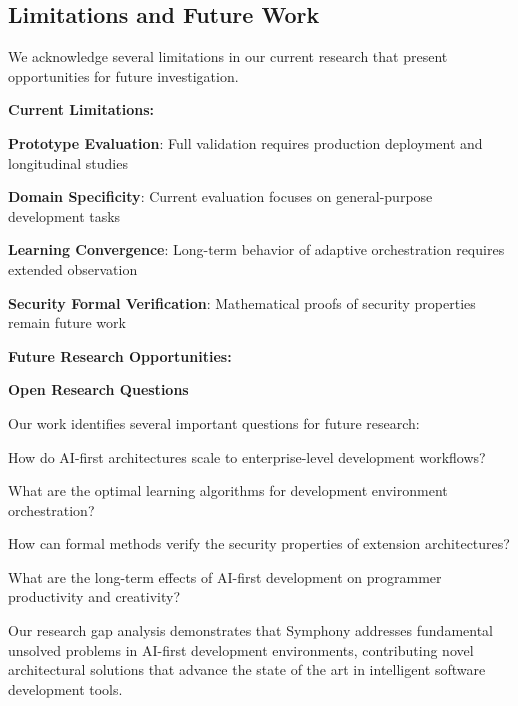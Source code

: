 \subsection{Limitations and Future Work}
\label{subsec:research-limitations}

We acknowledge several limitations in our current research that present opportunities for future investigation.

\textbf{Current Limitations:}

\begin{compactlist}
    \item \textbf{Prototype Evaluation}: Full validation requires production deployment and longitudinal studies
    \item \textbf{Domain Specificity}: Current evaluation focuses on general-purpose development tasks
    \item \textbf{Learning Convergence}: Long-term behavior of adaptive orchestration requires extended observation
    \item \textbf{Security Formal Verification}: Mathematical proofs of security properties remain future work
\end{compactlist}

\textbf{Future Research Opportunities:}

\begin{alertbox}
\textbf{Open Research Questions}

Our work identifies several important questions for future research:
\begin{compactlist}
    \item How do AI-first architectures scale to enterprise-level development workflows?
    \item What are the optimal learning algorithms for development environment orchestration?
    \item How can formal methods verify the security properties of extension architectures?
    \item What are the long-term effects of AI-first development on programmer productivity and creativity?
\end{compactlist}
\end{alertbox}

Our research gap analysis demonstrates that Symphony addresses fundamental unsolved problems in AI-first development environments, contributing novel architectural solutions that advance the state of the art in intelligent software development tools.

